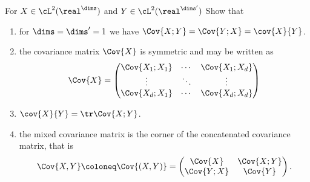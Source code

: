 \begin{exercise}
    \label{ex: covariance matrix}
    For \(X \in \cL^2(\real^\dims)\) and \(Y \in \cL^2(\real^{\dims'})\) Show
    that
    \begin{enumerate}[label=(\alph*), noitemsep]
        \item for \(\dims = \dims'=1\) we have \(\Cov{X;Y} = \Cov{Y;X} = \cov{X}{Y}\).
        \item the covariance matrix \(\Cov{X}\) is symmetric and may be written as
        \[
            \Cov{X} 
            = \begin{pmatrix}
                \Cov{X_1;X_1} & \cdots & \Cov{X_1;X_d} \\
                \vdots & \ddots & \vdots \\
                \Cov{X_d;X_1} & \cdots & \Cov{X_d;X_d}
            \end{pmatrix}
        \]

        \item \(\cov{X}{Y} = \tr\Cov{X;Y}\).

        \item the mixed covariance matrix is the corner of the concatenated
        covariance matrix, that is
        \[
            \Cov{X,Y} \coloneq \Cov{(X,Y)} = \begin{pmatrix}
                \Cov{X} & \Cov{X;Y} \\
                \Cov{Y;X} & \Cov{Y}
            \end{pmatrix}.
        \]

    \end{enumerate}
\end{exercise}

